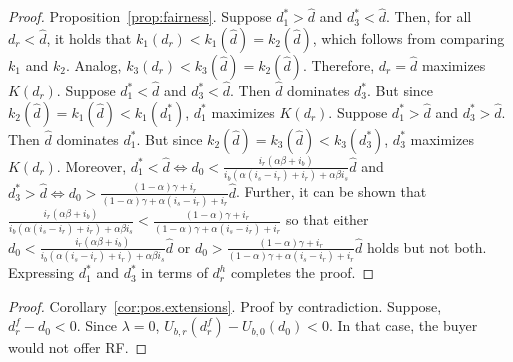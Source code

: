 \documentclass[a4paper,11pt]{article}
\newcommand{\dref}{\widehat d}
\newcommand{\dHyp}{d^h_r}
\renewcommand{\~}[1]{\tilde{#1}}
\renewcommand{\-}[1]{\overline{#1}}
\begin{document}
\begin{appendices}
\begin{proof}{Proposition~\ref{prop:fairness}.}
Suppose $d_1^*>\dref$ and $d_3^*<\dref$. Then, for all $d_r<\dref$, it holds that $k_1\left(d_r\right)<k_1\left(\dref\right)=k_2\left(\dref\right)$, which follows from comparing $k_1$ and $k_2$. Analog, $k_3\left(d_r\right)<k_3\left(\dref\right)=k_2\left(\dref\right)$. Therefore, $d_r=\dref$ maximizes $K\left(d_r\right)$. Suppose $d_1^*<\dref$ and $d_3^*<\dref$. Then $\dref$ dominates $d_3^*$. But since $k_2\left(\dref\right)=k_1\left(\dref\right)<k_1\left(d_1^*\right)$, $d_1^*$ maximizes $K\left(d_r\right)$. Suppose $d_1^*>\dref$ and $d_3^*>\dref$. Then $\dref$ dominates $d_1^*$. But since $k_2\left(\dref\right)=k_3\left(\dref\right)<k_3\left(d_3^*\right)$, $d_3^*$ maximizes $K\left(d_r\right)$. Moreover,  $d_1^*<\dref\Leftrightarrow d_0<\frac{ i_r (\alpha  \beta +i_b)}{i_b (\alpha (i_s- i_r)+i_r)+\alpha  \beta  i_s}\dref$ and  $d_3^*>\dref\Leftrightarrow d_0 >\frac{  \left(1-\alpha\right)\gamma  +i_r}{\left(1-\alpha\right)\gamma +\alpha \left(i_s- i_r\right)+i_r}\dref$. Further, it can be shown that $\frac{ i_r (\alpha  \beta +i_b)}{i_b (\alpha (i_s- i_r)+i_r)+\alpha  \beta  i_s}<\frac{  \left(1-\alpha\right)\gamma  +i_r}{\left(1-\alpha\right)\gamma +\alpha \left(i_s- i_r\right)+i_r}$ so that either $d_0<\frac{ i_r (\alpha  \beta +i_b)}{i_b (\alpha (i_s- i_r)+i_r)+\alpha  \beta  i_s}\dref$ or $d_0 >\frac{  \left(1-\alpha\right)\gamma  +i_r}{\left(1-\alpha\right)\gamma +\alpha \left(i_s- i_r\right)+i_r}\dref$ holds but not both. Expressing $d_1^*$ and $d_3^*$ in terms of $\dHyp$ completes the proof.
\end{proof}



\begin{proof}{Corollary~\ref{cor:pos.extensions}.}
Proof by contradiction. Suppose, $d^{f}_r - d_0 < 0$. Since $\lambda=0$, $ U_{b,r}\left(d_r^f\right)-U_{b,0}\left(d_0\right)<0$. In that case, the buyer would not offer RF.
\end{proof}


\end{appendices}
\end{document}
